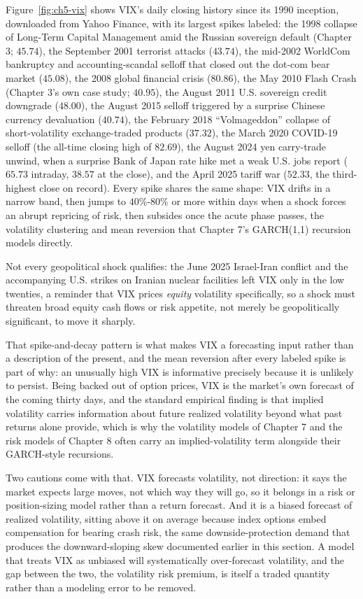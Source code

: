 \documentclass[../ai_in_finance]{subfiles}
\begin{document}
Figure~\ref{fig:ch5-vix} shows VIX's daily closing history since its 1990 inception, downloaded from Yahoo Finance, with its largest spikes labeled: the 1998
collapse of Long-Term Capital Management amid the Russian sovereign default (Chapter 3; $45.74$), the September 2001 terrorist attacks ($43.74$), the mid-2002
WorldCom bankruptcy and accounting-scandal selloff that closed out the dot-com bear market ($45.08$), the 2008 global financial crisis ($80.86$), the May 2010
Flash Crash (Chapter 3's own case study; $40.95$), the August 2011 U.S. sovereign credit downgrade ($48.00$), the August 2015 selloff triggered by a surprise
Chinese currency devaluation ($40.74$), the February 2018 ``Volmageddon'' collapse of short-volatility exchange-traded products ($37.32$), the March 2020
COVID-19 selloff (the all-time closing high of $82.69$), the August 2024 yen carry-trade unwind, when a surprise Bank of Japan rate hike met a weak U.S. jobs
report ($65.73$ intraday, $38.57$ at the close), and the April 2025 tariff war ($52.33$, the third-highest close on record). Every spike shares the same shape:
VIX drifts in a narrow band, then jumps to $40\%$-$80\%$ or more within days when a shock forces an abrupt repricing of risk, then subsides once the acute
phase passes, the volatility clustering and mean reversion that Chapter 7's GARCH(1,1) recursion models directly.

Not every geopolitical shock qualifies: the June 2025 Israel-Iran conflict and the accompanying U.S. strikes on Iranian nuclear facilities left VIX only in the
low twenties, a reminder that VIX prices \emph{equity} volatility specifically, so a shock must threaten broad equity cash flows or risk appetite, not merely be
geopolitically significant, to move it sharply.

That spike-and-decay pattern is what makes VIX a forecasting input rather than a description of the present, and the mean reversion after every labeled spike is
part of why: an unusually high VIX is informative precisely because it is unlikely to persist. Being backed out of option prices, VIX is the market's own
forecast of the coming thirty days, and the standard empirical finding is that implied volatility carries information about future realized volatility beyond
what past returns alone provide, which is why the volatility models of Chapter 7 and the risk models of Chapter 8 often carry an implied-volatility term
alongside their GARCH-style recursions.

Two cautions come with that. VIX forecasts volatility, not direction: it says the market expects large moves, not which way they will go, so it belongs in a
risk or position-sizing model rather than a return forecast. And it is a biased forecast of realized volatility, sitting above it on average because index
options embed compensation for bearing crash risk, the same downside-protection demand that produces the downward-sloping skew documented earlier in this
section. A model that treats VIX as unbiased will systematically over-forecast volatility, and the gap between the two, the volatility risk premium, is itself a
traded quantity rather than a modeling error to be removed.
\end{document}
